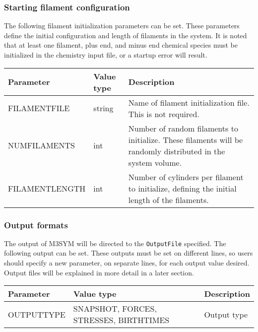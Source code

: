 \documentclass[11pt, oneside]{article}   	%
\begin{document}
\subsubsection{Starting filament configuration}

The following filament initialization parameters can be set. These parameters define the initial configuration and length
of filaments in the system. It is noted that at least one filament, plus end, and minus end chemical species must be initialized in the chemistry input file, or a startup error will result.

\begin{table} [!ht]
\centering
\begin{tabular}{|L{4cm}|C{4cm}|L{6cm}|}  
\hline
 \textbf{Parameter} & \textbf{Value type} & \textbf{Description} \\
 \hline
  FILAMENTFILE & string & Name of filament initialization file. This is not required.\\
  \hline
  NUMFILAMENTS & int & Number of random filaments to initialize. These filaments will be randomly 
  distributed in the system volume.\\
  \hline
  FILAMENTLENGTH & int & Number of cylinders per filament to initialize, defining the initial length of the filaments.\\
  \hline

\end{tabular}
\end{table}

\subsubsection{Output formats}

The output of M3SYM will be directed to the \texttt{OutputFile} specified. The following output can be set. These outputs must be set on different lines, so users should specify a new parameter, on separate lines, for each output value desired. Output files will be explained in more detail in a later section.

\begin{table} [!ht]
\centering
\begin{tabular}{|L{4cm}|C{6cm}|L{4cm}|}  
\hline
 \textbf{Parameter} & \textbf{Value type} & \textbf{Description} \\
 \hline
  OUTPUTTYPE & SNAPSHOT, FORCES, STRESSES, BIRTHTIMES & Output type\\
  \hline
 
\end{tabular}
\end{table}
\end{document}
